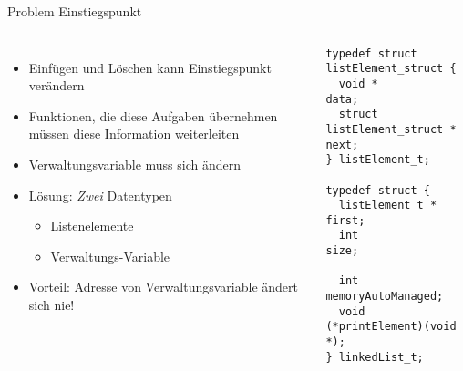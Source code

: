 \begin{frame}[fragile]{Problem Einstiegspunkt}
%
\begin{columns}[T]
\begin{itemize}
\item Einfügen und Löschen kann Einstiegspunkt verändern
\item Funktionen, die diese Aufgaben übernehmen müssen diese Information weiterleiten
\item Verwaltungsvariable muss sich ändern
\item Lösung: \emph{Zwei} Datentypen
	\begin{itemize}
	\item Listenelemente
	\item Verwaltungs-Variable
	\end{itemize}
\item Vorteil: Adresse von Verwaltungsvariable ändert sich nie!
\end{itemize}
%
\vspace{-5pt}
\begin{codebox}
\begin{verbatim}
typedef struct listElement_struct {
  void *                      data;
  struct listElement_struct * next;
} listElement_t;

typedef struct {
  listElement_t * first;
  int             size;
  
  int             memoryAutoManaged;
  void (*printElement)(void *);
} linkedList_t;
\end{verbatim}
\end{codebox}
\end{columns}
%
\end{frame}


